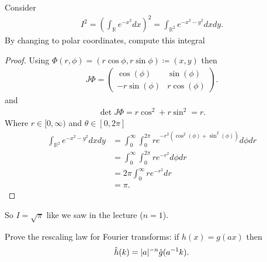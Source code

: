\begin{exercise}[b]
  Consider 
  \begin{align*}
    I^2= \left(\int_\mathbb{R} e^{-x^2} dx   \right)^2 =   \int_{\mathbb{R}^{2} } e^{-x^2-y^2} dx dy
  .\end{align*}
By changing to polar coordinates, compute this integral
\end{exercise}
\begin{proof}
 Using $\Phi(r,\phi ) = (r \cos \phi ,r \sin \phi ) \coloneqq (x,y)$  then 
 \begin{align*}
   J\Phi  = \begin{pmatrix} \cos(\phi ) & \sin(\phi ) \\ -r \sin(\phi ) &  r\cos(\phi )  \end{pmatrix} 
 .\end{align*}
 and 
 \begin{align*}
   \det{J\Phi } = r \cos^2 + r \sin^2 = r 
 .\end{align*}
 Where $r \in  [0,\infty)$ and $\theta \in [0,2\pi ]$
 \begin{align*}
   \int_{\mathbb{R}^{2}} e^{-x^2-y^2} dx dy &=  \int_0^{\infty} \int_0^{2\pi } r e^{-r^2(\cos^2(\phi) + \sin^2(\phi ))} d\phi dr \\
                                            &=\int_0^{\infty} \int_0^{2\pi}   r e^{-r^2} d\phi  dr \\
                                            &= 2\pi \int_0^{\infty}  r e^{-r^2} dr\\
                                            &= \pi 
 .\end{align*}
\end{proof}
So $I = \sqrt{\pi} $ like we saw in the lecture ($n=1$).
\begin{exercise}[c]
Prove the rescaling law for Fourier transforms:  if $h(x) = g(ax)$   then 
\begin{align*}
  \hat{h}(k)  = \lvert a\rvert^{-n} \hat{g}(a^{-1}k ) 
.\end{align*}
\end{exercise}
